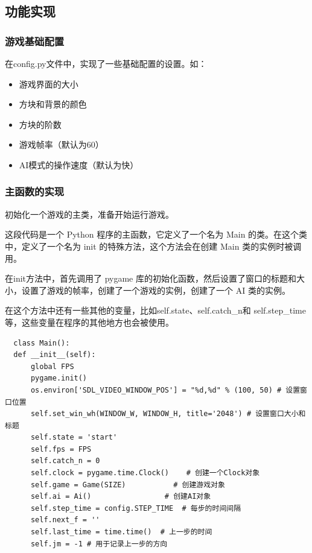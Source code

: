 \documentclass[UTF8,AutoFakeBold,AutoFakeSlant,zihao=-4]{ctexart}
\begin{document}
\subsection{功能实现}

\subsubsection{游戏基础配置}

在config.py文件中，实现了一些基础配置的设置。如：

\begin{itemize}
  \item 游戏界面的大小
  \item 方块和背景的颜色
  \item 方块的阶数
  \item 游戏帧率（默认为60）
  \item AI模式的操作速度（默认为快）
\end{itemize}


\subsubsection{主函数的实现}

初始化一个游戏的主类，准备开始运行游戏。

这段代码是一个 Python 程序的主函数，它定义了一个名为 Main 的类。在这个类中，定义了一个名为 init 的特殊方法，这个方法会在创建 Main 类的实例时被调用。

在init方法中，首先调用了 pygame 库的初始化函数，然后设置了窗口的标题和大小，设置了游戏的帧率，创建了一个游戏的实例，创建了一个 AI 类的实例。

在这个方法中还有一些其他的变量，比如self.state、self.catch\_n和 self.step\_time等，这些变量在程序的其他地方也会被使用。
\begin{lstlisting}
  class Main():
  def __init__(self):
      global FPS
      pygame.init()
      os.environ['SDL_VIDEO_WINDOW_POS'] = "%d,%d" % (100, 50) # 设置窗口位置
      self.set_win_wh(WINDOW_W, WINDOW_H, title='2048') # 设置窗口大小和标题
      self.state = 'start'
      self.fps = FPS
      self.catch_n = 0
      self.clock = pygame.time.Clock()    # 创建一个Clock对象
      self.game = Game(SIZE)           # 创建游戏对象
      self.ai = Ai()                 # 创建AI对象
      self.step_time = config.STEP_TIME  # 每步的时间间隔
      self.next_f = ''
      self.last_time = time.time()  # 上一步的时间
      self.jm = -1 # 用于记录上一步的方向
  \end{lstlisting}
\end{document}
